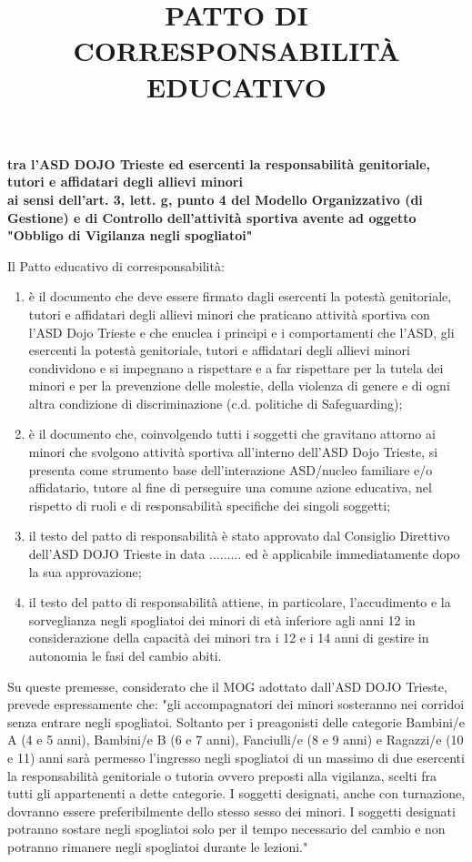 \documentclass{djtsmod}
\title{PATTO DI CORRESPONSABILITÀ EDUCATIVO}
\begin{document}
	\maketitle
	
	\begin{center}\bfseries
		tra l'ASD DOJO Trieste ed esercenti la responsabilità genitoriale, tutori e affidatari degli allievi minori \\[5pt]
		ai sensi dell'art. 3, lett. g, punto 4 del Modello Organizzativo (di Gestione) e di Controllo dell'attività sportiva avente ad oggetto "Obbligo di Vigilanza negli spogliatoi"
	\end{center}
	
	Il Patto educativo di corresponsabilità:
	\begin{enumerate}[label=\alph*)]
		\item è il documento che deve essere firmato dagli esercenti la potestà genitoriale, tutori e affidatari degli allievi minori che praticano attività sportiva con l'ASD Dojo Trieste e che enuclea i principi e i comportamenti che l'ASD, gli esercenti la potestà genitoriale, tutori e affidatari degli allievi minori condividono e si impegnano a rispettare e a far rispettare per la tutela dei minori e per la prevenzione delle molestie, della violenza di genere e di ogni altra condizione di discriminazione (c.d. politiche di Safeguarding);
		\item è il documento che, coinvolgendo tutti i soggetti che gravitano attorno ai minori che svolgono attività sportiva all'interno dell'ASD Dojo Trieste, si presenta come strumento base dell'interazione ASD/nucleo familiare e/o affidatario, tutore al fine di perseguire una comune azione educativa, nel rispetto di ruoli e di responsabilità specifiche dei singoli soggetti;
		\item il testo del patto di responsabilità è stato approvato dal Consiglio Direttivo dell'ASD DOJO Trieste in data $\ldots\ldots\ldots$ ed è applicabile immediatamente dopo la sua approvazione;
		\item il testo del patto di responsabilità attiene, in particolare, l'accudimento e la sorveglianza negli spogliatoi dei minori di età inferiore agli anni 12 in considerazione della capacità dei minori tra i 12 e i 14 anni di gestire in autonomia le fasi del cambio abiti.
	\end{enumerate}
	Su queste premesse, considerato che il MOG adottato dall'ASD DOJO Trieste, prevede espressamente che: "gli accompagnatori dei minori sosteranno nei corridoi senza entrare negli spogliatoi. Soltanto per i preagonisti delle categorie Bambini/e A (4 e 5 anni), Bambini/e B (6 e 7 anni), Fanciulli/e (8 e 9 anni) e Ragazzi/e (10 e 11) anni sarà permesso l'ingresso negli spogliatoi di un massimo di due esercenti la responsabilità genitoriale o tutoria ovvero preposti alla vigilanza, scelti fra tutti gli appartenenti a dette categorie. I soggetti designati, anche con turnazione, dovranno essere preferibilmente dello stesso sesso dei minori. I soggetti designati potranno sostare negli spogliatoi solo per il tempo necessario del cambio e non potranno rimanere negli spogliatoi durante le lezioni." \\[5pt]
\end{document}
